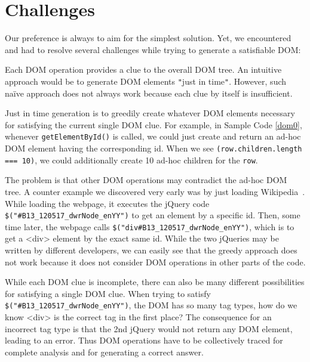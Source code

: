 \section{Challenges}
Our preference is always to aim for the simplest solution.  Yet, we encountered and had to resolve several challenges while trying to generate a satisfiable DOM:

Each DOM operation provides a clue to the overall DOM tree.  An intuitive approach would be to generate DOM elements {\tt "}just in time{\tt "}.  
However, such na\"ive approach does not always work because each clue by itself is insufficient.  

Just in time generation is to greedily create whatever DOM elements necessary for satisfying the current single DOM clue.  
For example, in Sample Code \ref{dom0}, whenever {\tt getElementById()} is called, we could just create and return an ad-hoc DOM element having the corresponding id.  
When we see {\tt (row.children.length === 10)}, we could additionally create 10 ad-hoc children for the {\tt row}.  

The problem is that other DOM operations may contradict the ad-hoc DOM tree.  
A counter example we discovered very early was by just loading Wikipedia~\cite{wikipedia}.  
While loading the webpage, it executes the jQuery code {\tt \$("\#B13\_120517\_dwrNode\_enYY")} to get an element by a specific id.  
Then, some time later, the webpage calls {\tt \$("div\#B13\_120517\_dwrNode\_enYY")}, which is to get a <div> element by the exact same id.  
While the two jQueries may be written by different developers, we can easily see that the greedy approach does not work because it does not consider DOM operations in other parts of the code.  

While each DOM clue is incomplete, there can also be many different possibilities for satisfying a single DOM clue.  
When trying to satisfy {\tt \$("\#B13\_120517\_dwrNode\_enYY")}, the DOM has so many tag types, how do we know <div> is the correct tag in the first place?  
The consequence for an incorrect tag type is that the 2nd jQuery would not return any DOM element, leading to an error.  
Thus DOM operations have to be collectively traced for complete analysis and for generating a correct answer.  


